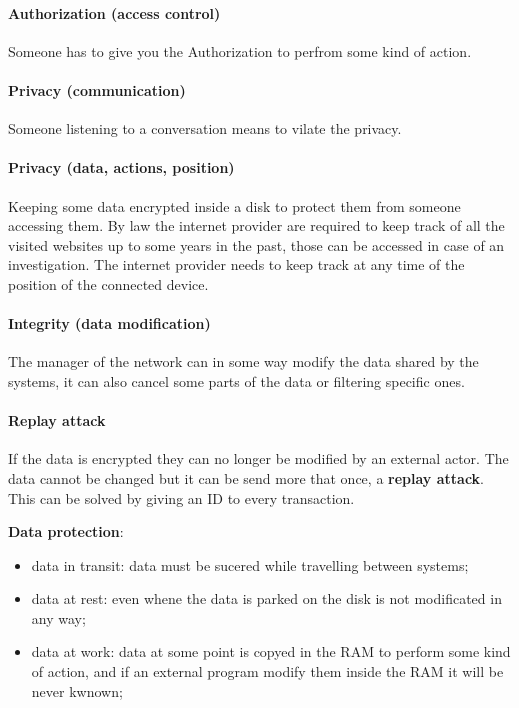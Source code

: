 \documentclass[12pt]{article}
\begin{document}
\paragraph{Authorization (access control)}
Someone has to give you the Authorization to perfrom some kind of action.

\paragraph{Privacy (communication)}
Someone listening to a conversation means to vilate the privacy.

\paragraph{Privacy (data, actions, position)}
Keeping some data encrypted inside a disk to protect them from someone accessing them. By law the internet provider are required to keep track of all the visited websites up to some years in the past, those can be accessed in case of an investigation. The internet provider needs to keep track at any time of the position of the connected device.

\paragraph{Integrity (data modification)}
The manager of the network can in some way modify the data shared by the systems, it can also cancel some parts of the data or filtering specific ones.

\paragraph{Replay attack}
If the data is encrypted they can no longer be modified by an external actor. The data cannot be changed but it can be send more that once, a \textbf{replay attack}. This can be solved by giving an ID to every transaction.

\textbf{Data protection}:
\begin{itemize}
    \item data in transit: data must be sucered while travelling between systems;
    \item data at rest: even whene the data is parked on the disk is not modificated in any way;
    \item data at work: data at some point is copyed in the RAM to perform some kind of action, and if an external program modify them inside the RAM it will be never kwnown;
\end{itemize}
\end{document}
